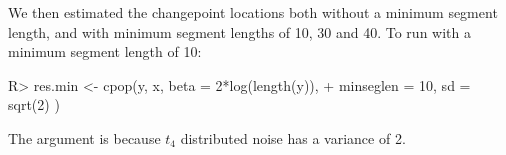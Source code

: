 \documentclass[article]{jss}
\begin{document}
We then estimated the changepoint locations both without a minimum segment length, and with minimum segment lengths of 10, 30 and 40. To run  with a minimum segment length of 10:
\begin{CodeChunk}
\begin{CodeInput}
R> res.min <- cpop(y, x, beta = 2*log(length(y)),
+  minseglen = 10, sd = sqrt(2) )
\end{CodeInput}
\end{CodeChunk}
The argument  is because $t_4$ distributed noise has a variance of 2.
%
%
%
\end{document}

